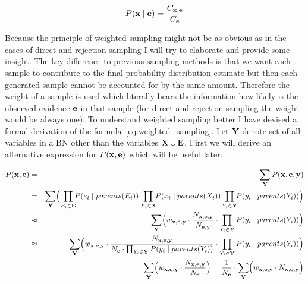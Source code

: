 \documentclass[english,cover]{fitthesis} %
\newcommand{\vars}[1]{{\bold{#1}}}         %
\begin{document}
\begin{equation}\label{eq:weighted_sampling}
    P(\vars{x} \mid \vars{e})
    = \frac{C_{\vars{x},\vars{e}}}{C_{\vars{e}}}
\end{equation}

Because the principle of weighted sampling might not be as obvious as in the cases of direct and rejection sampling I will try to elaborate and provide some insight. The key difference to previous sampling methods is that we want each sample to contribute to the final probability distribution estimate but then each generated sample cannot be accounted for by the same amount. Therefore the weight of a sample is used which literally bears the information how likely is the observed evidence $\vars{e}$ in that sample (for direct and rejection sampling the weight would be always one).
To understand weighted sampling better I have devised  a formal derivation of the formula~\eqref{eq:weighted_sampling}. Let $\vars{Y}$ denote set of all variables in a BN other than the variables $\vars{X} \cup \vars{E}$. First we will derive an alternative expression for $P(\vars{x}, \vars{e})$ which will be useful later.

\begin{eqnarray}
    P(\vars{x}, \vars{e})
    & = & \sum_\vars{Y} P(\vars{x}, \vars{e}, \vars{y}) \nonumber\\
    & = &
       \sum_\vars{Y} \Bigl( \prod_{E_i \in \vars{E}} \!\! P(e_i \mid parents(E_i)) \prod_{X_i \in \vars{X}} \!\! P(x_i \mid parents(X_i)) \prod_{Y_i \in \vars{Y}} \!\! P(y_i \mid parents(Y_i)) \Bigr) \nonumber\\
    & \approx &
       \sum_\vars{Y} \Bigl( w_{\vars{x},\vars{e},\vars{y}} \cdot \frac{N_{\vars{x},\vars{e},\vars{y}}}{N_{\vars{e},\vars{y}}} \cdot \prod_{Y_i \in \vars{Y}} P(y_i \mid parents(Y_i)) \Bigr) \nonumber\\
    & \approx &
       \sum_\vars{Y} \Bigl( w_{\vars{x},\vars{e},\vars{y}} \cdot \frac{N_{\vars{x},\vars{e},\vars{y}}}{N_{\vars{e}} \cdot \prod_{Y_i \in \vars{Y}} P(y_i \mid parents(Y_i))} \cdot \prod_{Y_i \in \vars{Y}} P(y_i \mid parents(Y_i)) \Bigr) \nonumber\\
    & = &
        \sum_\vars{Y} \Bigl( w_{\vars{x},\vars{e},\vars{y}} \cdot \frac{N_{\vars{x},\vars{e},\vars{y}}}{N_{\vars{e}}} \Bigr)
        = \frac{1}{N_\vars{e}} \cdot \sum_\vars{Y} \Bigl( w_{\vars{x},\vars{e},\vars{y}} \cdot N_{\vars{x},\vars{e},\vars{y}}\Bigr) \label{eq:weighted_sampling_P_x_e}
\end{eqnarray}
\end{document}
